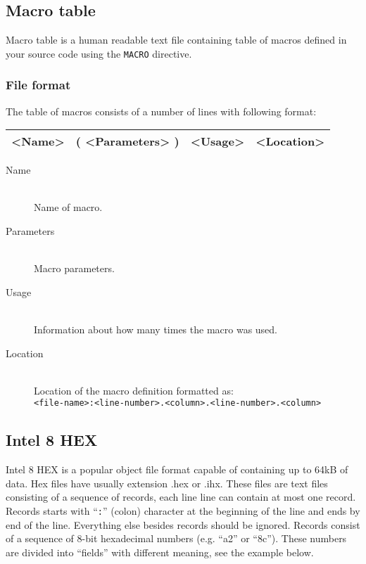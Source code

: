     \clearpage
    \subsection{Macro table}
        Macro table is a human readable text file containing table of macros defined in your source code using the \texttt{MACRO} directive.

        \subsubsection{File format}
            The table of macros consists of a number of lines with following format:

            \begin{tabular}{|cccc|}
                \hline
                <Name> & ( <Parameters> ) & <Usage> & <Location> \\\hline
            \end{tabular}

            \begin{description}
                \item[Name]~\\
                    Name of macro.
                \item[Parameters]~\\
                    Macro parameters.
                \item[Usage]~\\
                    Information about how many times the macro was used.
                \item[Location]~\\
                    Location of the macro definition formatted as:\\
                    \texttt{<file-name>:<line-number>.<column>.<line-number>.<column>}
            \end{description}

    \enlargethispage{3\baselineskip}
    \subsection{Intel 8 HEX}
        Intel 8 HEX is a popular object file format capable of containing up to 64kB of data. Hex files have usually extension .hex or .ihx. These files are text files consisting of a sequence of records, each line line can contain at most one record. Records starts with ``\texttt{:}'' (colon) character at the beginning of the line and ends by end of the line. Everything else besides records should be ignored. Records consist of a sequence of 8-bit hexadecimal numbers (e.g. ``a2'' or ``8c''). These numbers are divided into ``fields'' with different meaning, see the example below.

